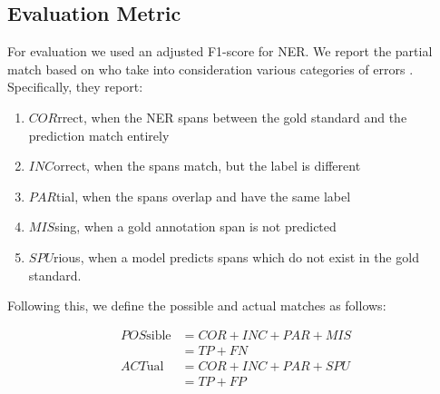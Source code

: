 \documentclass[11pt]{article}
\begin{document}
\subsection{Evaluation Metric}
For evaluation we used an adjusted F1-score for NER. We report the partial match based on \citet{segura-bedmar-etal-2013-semeval} who take into consideration various categories of errors \citep{chinchor-sundheim-1993-muc}. Specifically, they report:
\begin{enumerate}
\itemsep0em
    \item $COR$rrect, when the NER spans between the gold standard and the prediction match entirely
    \item $INC$orrect, when the spans match, but the label is different
    \item $PAR$tial, when the spans overlap and have the same label
    \item $MIS$sing, when a gold annotation span is not predicted
    \item $SPU$rious, when a model predicts spans which do not exist in the gold standard.
\end{enumerate}
Following this, we define the possible and actual matches as follows:

\begin{displaymath}
\begin{aligned}
POS\text{sible} &= COR + INC + PAR + MIS \\
&= TP + FN \\
ACT\text{ual} &= COR + INC + PAR + SPU \\
&= TP + FP
\end{aligned}
\end{displaymath}


\end{document}
